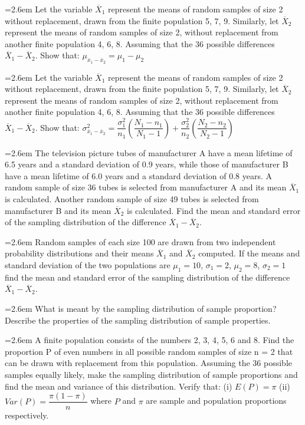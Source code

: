 \documentclass[11pt,a4paper]{article}
\newcommand{\Q}[2]{\par\smallskip\noindent\hangindent=2.6em\hangafter=1
  \makebox[2.6em][l]{\textbf{#1.}}#2\par}
\begin{document}
\Q{102}{Let the variable $\overline{X}_{1}$ represent the means of random samples of size 2 without replacement, drawn from the finite population 5, 7, 9. Similarly, let $\overline{X}_{2}$ represent the means of random samples of size 2, without replacement from another finite population 4, 6, 8. Assuming that the 36 possible differences $\overline{X}_{1}-\overline{X}_{2}$. Show that: $\mu_{\overline{x}_{1}-\overline{x}_{2}}=\mu_{1}-\mu_{2}$}
\Q{103}{Let the variable $\overline{X}_{1}$ represent the means of random samples of size 2 without replacement, drawn from the finite population 5, 7, 9. Similarly, let $\overline{X}_{2}$ represent the means of random samples of size 2, without replacement from another finite population 4, 6, 8. Assuming that the 36 possible differences $\overline{X}_{1}-\overline{X}_{2}$. Show that: $\sigma^{2}_{\overline{x}_{1}-\overline{x}_{2}}=\dfrac{\sigma_{1}^{2}}{n_{1}}\left(\dfrac{N_{1}-n_{1}}{N_{1}-1}\right)+\dfrac{\sigma_{2}^{2}}{n_{2}}\left(\dfrac{N_{2}-n_{2}}{N_{2}-1}\right)$}
\Q{104}{The television picture tubes of manufacturer A have a mean lifetime of 6.5 years and a standard deviation of 0.9 years, while those of manufacturer B have a mean lifetime of 6.0 years and a standard deviation of 0.8 years. A random sample of size 36 tubes is selected from manufacturer A and its mean $\overline{X}_{1}$ is calculated. Another random sample of size 49 tubes is selected from manufacturer B and its mean $\overline{X}_{2}$ is calculated. Find the mean and standard error of the sampling distribution of the difference $\overline{X}_{1}-\overline{X}_{2}$.}
\Q{105}{Random samples of each size 100 are drawn from two independent probability distributions and their means $\overline{X}_{1}$ and $\overline{X}_{2}$ computed. If the means and standard deviation of the two populations are $\mu_{1}=10$, $\sigma_{1}=2$, $\mu_{2}=8$, $\sigma_{2}=1$ find the mean and standard error of the sampling distribution of the difference $\overline{X}_{1}-\overline{X}_{2}$.}
\Q{106}{What is meant by the sampling distribution of sample proportion? Describe the properties of the sampling distribution of sample properties.}
\Q{107}{A finite population consists of the numbers 2, 3, 4, 5, 6 and 8. Find the proportion P of even numbers in all possible random samples of size n = 2 that can be drawn with replacement from this population. Assuming the 36 possible samples equally likely, make the sampling distribution of sample proportions and find the mean and variance of this distribution. Verify that: (i) $E(P)=\pi$ (ii) $Var(P)=\dfrac{\pi(1-\pi)}{n}$ where $P$ and $\pi$ are sample and population proportions respectively.}
\end{document}

